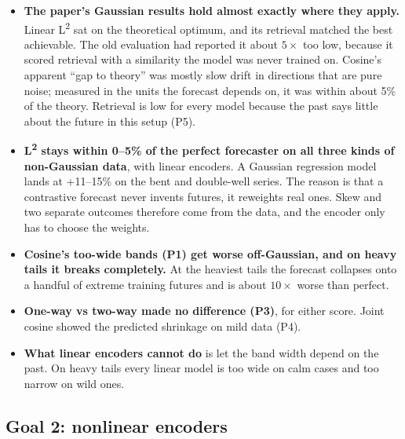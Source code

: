 \documentclass[11pt]{article}
\newcommand{\Ltwo}{L\textsuperscript{2}}
\begin{document}
\begin{itemize}
\item \textbf{The paper's Gaussian results hold almost exactly where they apply.}
  Linear \Ltwo{} sat on the theoretical optimum, and its retrieval matched the best
  achievable. The old evaluation had reported it about $5\times$ too low, because it scored
  retrieval with a similarity the model was never trained on. Cosine's apparent ``gap to
  theory'' was mostly slow drift in directions that are pure noise; measured in the units
  the forecast depends on, it was within about 5\% of the theory. Retrieval is low for
  every model because the past says little about the future in this setup (P5).
\item \textbf{\Ltwo{} stays within 0--5\% of the perfect forecaster on all three kinds of
  non-Gaussian data}, with linear encoders. A Gaussian regression model lands at +11--15\%
  on the bent and double-well series. The reason is that a contrastive forecast never
  invents futures, it reweights real ones. Skew and two separate outcomes therefore come
  from the data, and the encoder only has to choose the weights.
\item \textbf{Cosine's too-wide bands (P1) get worse off-Gaussian, and on heavy tails it
  breaks completely.} At the heaviest tails the forecast collapses onto a handful of
  extreme training futures and is about $10\times$ worse than perfect.
\item \textbf{One-way vs two-way made no difference (P3)}, for either score. Joint cosine
  showed the predicted shrinkage on mild data (P4).
\item \textbf{What linear encoders cannot do} is let the band width depend on the past. On
  heavy tails every linear model is too wide on calm cases and too narrow on wild ones.
\end{itemize}

\subsection{Goal 2: nonlinear encoders}
\end{document}
